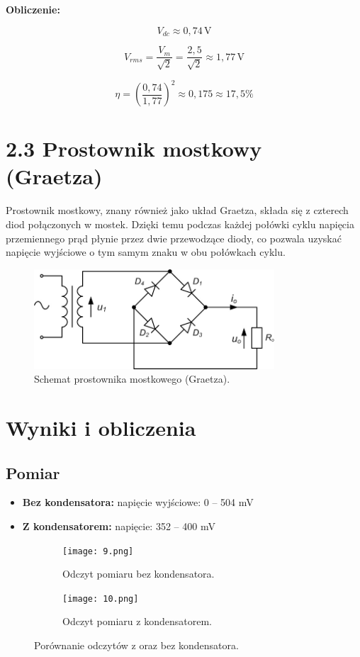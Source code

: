 \documentclass[a4paper,12pt]{article}
\begin{document}
\textbf{Obliczenie:}

\[
V_{dc} \approx 0{,}74\,\text{V}
\]

\[
V_{rms} = \frac{V_m}{\sqrt{2}} = \frac{2{,}5}{\sqrt{2}} \approx 1{,}77\,\text{V}
\]

\[
\eta = \left( \frac{0{,}74}{1{,}77} \right)^2 \approx 0{,}175 \approx 17{,}5\%
\]
\section*{2.3 Prostownik mostkowy (Graetza)}

Prostownik mostkowy, znany również jako układ Graetza, składa się z czterech diod połączonych w mostek. Dzięki temu podczas każdej połówki cyklu napięcia przemiennego prąd płynie przez dwie przewodzące diody, co pozwala uzyskać napięcie wyjściowe o tym samym znaku w obu połówkach cyklu.

\begin{figure}[H]
    \centering
    \includegraphics[width=0.8\textwidth]{8.png}
    \caption{Schemat prostownika mostkowego (Graetza).}
    \label{fig:schemat_mostek}
\end{figure}

\section*{Wyniki i obliczenia}

\subsection*{Pomiar}

\begin{itemize}
    \item \textbf{Bez kondensatora:} napięcie wyjściowe: 0 -- 504 mV
    \item \textbf{Z kondensatorem:} napięcie: 352 -- 400 mV
\end{itemize}
\begin{figure}[h]
    \centering
    \begin{subfigure}{0.45\textwidth}
        \centering
        \texttt{[image: 9.png]}
        \caption{Odczyt pomiaru bez kondensatora.}
        \label{fig:schemat1}
    \end{subfigure}
    \hfill
    \begin{subfigure}{0.45\textwidth}
        \centering
        \texttt{[image: 10.png]}
        \caption{Odczyt pomiaru z kondensatorem.}
        \label{fig:schemat2}
    \end{subfigure}
    \caption{Porównanie odczytów z oraz bez kondensatora.}
    \label{fig:porownanie}
\end{figure}
\end{document}
